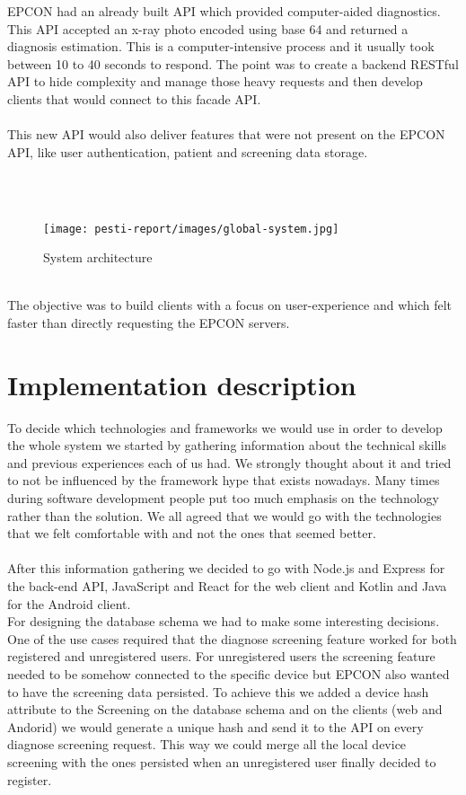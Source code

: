
EPCON had an already built API which provided computer-aided diagnostics. This API accepted an x-ray photo encoded using base 64 and returned a diagnosis estimation. This is a computer-intensive process and it usually took between 10 to 40 seconds to respond. The point was to create a backend RESTful API to hide complexity and manage those heavy requests and then develop clients that would connect to this facade API.
\\ \\
This new API would also deliver features that were not present on the EPCON API, like user authentication, patient and screening data storage.

\\ \\
\begin{figure}[H]
	\centering
	\texttt{[image: pesti-report/images/global-system.jpg]}
	\caption{System architecture}
	\label{fig:global-system}
\end{figure}
\\

The objective was to build clients with a focus on user-experience and which felt faster than directly requesting the EPCON servers.

\section{Implementation description}

To decide which technologies and frameworks we would use in order to develop the whole system we started by gathering information about the technical skills and previous experiences each of us had. We strongly thought about it and tried to not be influenced by the framework hype that exists nowadays. Many times during software development people put too much emphasis on the technology rather than the solution. We all agreed that we would go with the technologies that we felt comfortable with and not the ones that seemed better.
\\ \\
After this information gathering we decided to go with Node.js and Express for the back-end API, JavaScript and React for the web client and Kotlin and Java for the Android client.
\\
For designing the database schema we had to make some interesting decisions. One of the use cases required that the diagnose screening feature worked for both registered and unregistered users. For unregistered users the screening feature needed to be somehow connected to the specific device but EPCON also wanted to have the screening data persisted. To achieve this we added a device hash attribute to the Screening on the database schema and on the clients (web and Andorid) we would generate a unique hash and send it to the API on every diagnose screening request. This way we could merge all the local device screening with the ones persisted when an unregistered user finally decided to register.

